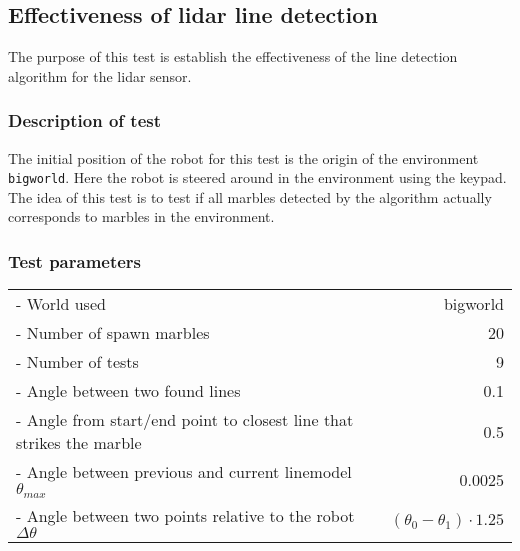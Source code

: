 \documentclass[../Head/Main.tex]{subfiles}
\begin{document}
\subsection{Effectiveness of lidar line detection}

The purpose of this test is establish the effectiveness of the line detection algorithm for the lidar sensor.

\subsubsection*{Description of test}
The initial position of the robot for this test is the origin of the environment \texttt{bigworld}. Here the robot is steered around in the environment using the keypad. The idea of this test is to test if all marbles detected by the algorithm actually corresponds to marbles in the environment.     

\subsubsection*{Test parameters}
\begin{tabular}{l r}
	- World used                & bigworld\\	
	- Number of spawn marbles   & 20\\
	- Number of tests           & 9\\
	- Angle between two found lines & 0.1\\
	- Angle from start/end point to closest line that strikes the marble & 0.5\\
	- Angle between previous and current linemodel $\theta_{max}$ & 0.0025 \\
	- Angle between two points relative to the robot $\Delta\theta$ & $\left(\theta_0 - \theta_1\right) \cdot 1.25$ 
\end{tabular}
\end{document}
